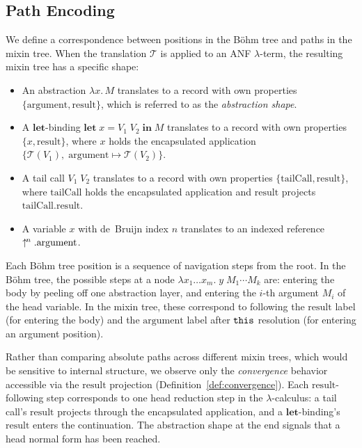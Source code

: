 \subsection{Path Encoding}

We define a correspondence between positions in the B\"ohm tree
and paths in the mixin tree.
When the translation $\mathcal{T}$ is applied to an ANF
$\lambda$-term, the resulting mixin tree has a specific shape:
\begin{itemize}
  \item An abstraction $\lambda x.\, M$ translates to a record
    with own properties $\{\mathrm{argument}, \mathrm{result}\}$,
    which is referred to as the \emph{abstraction shape}.
  \item A $\mathbf{let}$-binding
    $\mathbf{let}\; x = V_1\; V_2 \;\mathbf{in}\; M$ translates
    to a record with own properties $\{x, \mathrm{result}\}$,
    where $x$ holds the encapsulated application
    $\{\mathcal{T}(V_1),\; \mathrm{argument} \mapsto
    \mathcal{T}(V_2)\}$.
  \item A tail call $V_1\; V_2$ translates to a record with own
    properties $\{\mathrm{tailCall}, \mathrm{result}\}$, where
    $\mathrm{tailCall}$ holds the encapsulated application and
    $\mathrm{result}$ projects
    $\mathrm{tailCall}.\mathrm{result}$.
  \item A variable $x$ with de~Bruijn index $n$ translates to
    an indexed reference $\uparrow^{\!n}.\mathrm{argument}$.
\end{itemize}

\noindent
Each B\"ohm tree position is a sequence of navigation steps from
the root.
In the B\"ohm tree, the possible steps at a node
$\lambda x_1 \ldots x_m.\; y\; M_1 \cdots M_k$ are:
entering the body by peeling off one abstraction layer, and
entering the $i$-th argument $M_i$ of the head variable.
In the mixin tree, these correspond to following the
$\mathrm{result}$ label (for entering the body) and the
$\mathrm{argument}$ label after $\mathtt{this}$ resolution (for
entering an argument position).

Rather than comparing absolute paths across different mixin
trees, which would be sensitive to internal structure, we
observe only the \emph{convergence} behavior accessible via
the $\mathrm{result}$ projection
(Definition~\ref{def:convergence}).
Each $\mathrm{result}$-following step corresponds to one head
reduction step in the $\lambda$-calculus: a tail call's
$\mathrm{result}$ projects through the encapsulated
application, and a $\mathbf{let}$-binding's $\mathrm{result}$
enters the continuation.
The abstraction shape at the end signals that a head
normal form has been reached.


